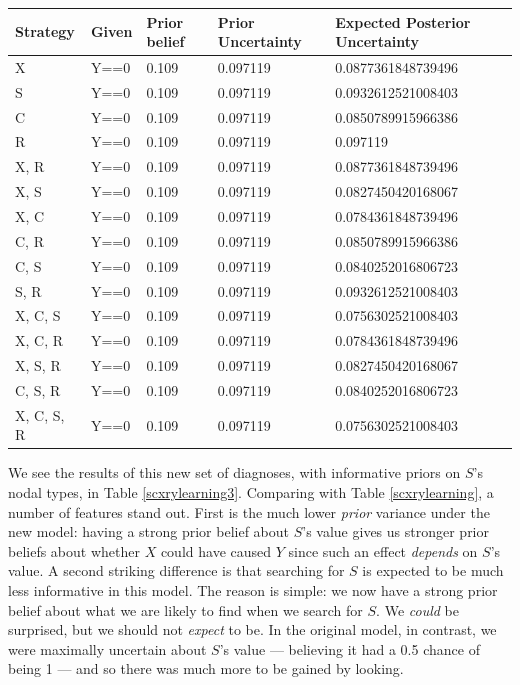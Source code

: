 \documentclass[
  12pt,
]{book}
\begin{document}
\begin{tabular}{l|l|l|l|l}
\hline
Strategy & Given & Prior belief & Prior Uncertainty & Expected Posterior Uncertainty\\
\hline
X & Y==0 & 0.109 & 0.097119 & 0.0877361848739496\\
\hline
S & Y==0 & 0.109 & 0.097119 & 0.0932612521008403\\
\hline
C & Y==0 & 0.109 & 0.097119 & 0.0850789915966386\\
\hline
R & Y==0 & 0.109 & 0.097119 & 0.097119\\
\hline
X, R & Y==0 & 0.109 & 0.097119 & 0.0877361848739496\\
\hline
X, S & Y==0 & 0.109 & 0.097119 & 0.0827450420168067\\
\hline
X, C & Y==0 & 0.109 & 0.097119 & 0.0784361848739496\\
\hline
C, R & Y==0 & 0.109 & 0.097119 & 0.0850789915966386\\
\hline
C, S & Y==0 & 0.109 & 0.097119 & 0.0840252016806723\\
\hline
S, R & Y==0 & 0.109 & 0.097119 & 0.0932612521008403\\
\hline
X, C, S & Y==0 & 0.109 & 0.097119 & 0.0756302521008403\\
\hline
X, C, R & Y==0 & 0.109 & 0.097119 & 0.0784361848739496\\
\hline
X, S, R & Y==0 & 0.109 & 0.097119 & 0.0827450420168067\\
\hline
C, S, R & Y==0 & 0.109 & 0.097119 & 0.0840252016806723\\
\hline
X, C, S, R & Y==0 & 0.109 & 0.097119 & 0.0756302521008403\\
\hline
\end{tabular}

We see the results of this new set of diagnoses, with informative priors on \(S\)'s nodal types, in Table \ref{scxrylearning3}. Comparing with Table \ref{scxrylearning}, a number of features stand out. First is the much lower \emph{prior} variance under the new model: having a strong prior belief about \(S\)'s value gives us stronger prior beliefs about whether \(X\) could have caused \(Y\) since such an effect \emph{depends} on \(S\)'s value. A second striking difference is that searching for \(S\) is expected to be much less informative in this model. The reason is simple: we now have a strong prior belief about what we are likely to find when we search for \(S\). We \emph{could} be surprised, but we should not \emph{expect} to be. In the original model, in contrast, we were maximally uncertain about \(S\)'s value --- believing it had a 0.5 chance of being 1 --- and so there was much more to be gained by looking.
\end{document}
